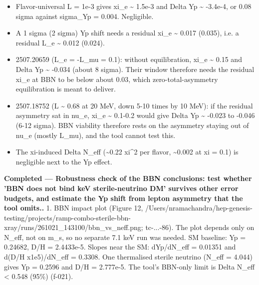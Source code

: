 \documentclass[11pt,a4paper]{article}
\begin{document}
\begin{itemize}
  \item Flavor-universal L = 1e-3 gives xi\_e \textasciitilde{} 1.5e-3 and Delta Yp \textasciitilde{} -3.4e-4, or 0.08 sigma against sigma\_Yp = 0.004. Negligible.
  \item A 1 sigma (2 sigma) Yp shift needs a residual xi\_e \textasciitilde{} 0.017 (0.035), i.e. a residual L\_e \textasciitilde{} 0.012 (0.024).
  \item 2507.20659 (L\_e = -L\_mu = 0.1): without equilibration, xi\_e \textasciitilde{} 0.15 and Delta Yp \textasciitilde{} -0.034 (about 8 sigma). Their window therefore needs the residual xi\_e at BBN to be below about 0.03, which zero-total-asymmetry equilibration is meant to deliver.
  \item 2507.18752 (L \textasciitilde{} 0.68 at 20 MeV, down 5-10 times by 10 MeV): if the residual asymmetry sat in nu\_e, xi\_e \textasciitilde{} 0.1-0.2 would give Delta Yp \textasciitilde{} -0.023 to -0.046 (6-12 sigma). BBN viability therefore rests on the asymmetry staying out of nu\_e (mostly L\_mu), and the tool cannot test this.
  \item The xi-induced Delta N\_eff (\textasciitilde{}0.22 xi\textasciicircum{}2 per flavor, \textasciitilde{}0.002 at xi = 0.1) is negligible next to the Yp effect.
\end{itemize}
\textbf{Completed --- Robustness check of the BBN conclusions: test whether 'BBN does not bind keV sterile-neutrino DM' survives other error budgets, and estimate the Yp shift from lepton asymmetry that the tool omits..} 1. BBN impact plot (Figure 12, /Users/nramachandra/hep-genesis-testing/projects/ramp-combo-sterile-bbn-xray/runs/261021\_143100/bbn\_vs\_neff.png; tc-...-86). The plot depends only on N\_eff, not on m\_s, so no separate 7.1 keV run was needed. SM baseline: Yp = 0.24682, D/H = 2.4433e-5. Slopes near the SM: dYp/dN\_eff = 0.01351 and d(D/H x1e5)/dN\_eff = 0.3308. One thermalised sterile neutrino (N\_eff = 4.044) gives Yp = 0.2596 and D/H = 2.777e-5. The tool's BBN-only limit is Delta N\_eff \textless{} 0.548 (95\%) (f-021).
\end{document}
